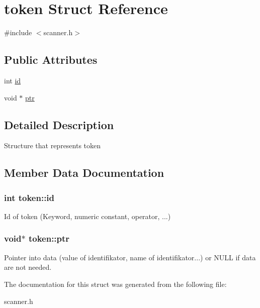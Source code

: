 \hypertarget{structtoken}{}\section{token Struct Reference}
\label{structtoken}


{\ttfamily \#include $<$scanner.\+h$>$}

\subsection*{Public Attributes}
\begin{DoxyCompactItemize}
\item 
int \hyperlink{structtoken_a0bb5b4fb1d645554ebecfd03eeb24f93}{id}
\item 
void $\ast$ \hyperlink{structtoken_a10ee4b9954a7330aeabf87082fee7bbd}{ptr}
\end{DoxyCompactItemize}


\subsection{Detailed Description}
Structure that represents token 

\subsection{Member Data Documentation}
\hypertarget{structtoken_a0bb5b4fb1d645554ebecfd03eeb24f93}{}
\subsubsection[{id}]{\setlength{\rightskip}{0pt plus 5cm}int token\+::id}\label{structtoken_a0bb5b4fb1d645554ebecfd03eeb24f93}
Id of token (Keyword, numeric constant, operator, ...) \hypertarget{structtoken_a10ee4b9954a7330aeabf87082fee7bbd}{}
\subsubsection[{ptr}]{\setlength{\rightskip}{0pt plus 5cm}void$\ast$ token\+::ptr}\label{structtoken_a10ee4b9954a7330aeabf87082fee7bbd}
Pointer into data (value of identifikator, name of identifikator...) or N\+U\+L\+L if data are not needed. 

The documentation for this struct was generated from the following file\+:\begin{DoxyCompactItemize}
\item 
scanner.\+h\end{DoxyCompactItemize}
